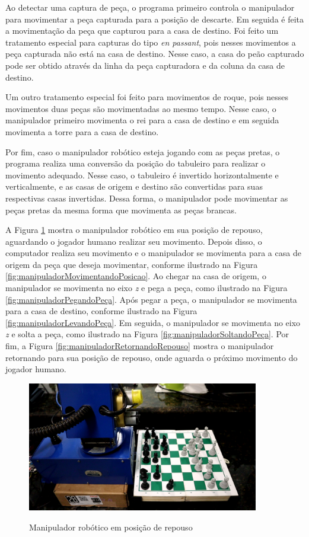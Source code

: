 Ao detectar uma captura de peça, o programa primeiro controla o manipulador para movimentar a peça capturada para a posição de descarte.
Em seguida é feita a movimentação da peça que capturou para a casa de destino.
Foi feito um tratamento especial para capturas do tipo \textit{en passant}, pois nesses movimentos a peça capturada não está na casa de destino.
Nesse caso, a casa do peão capturado pode ser obtido através da linha da peça capturadora e da coluna da casa de destino.

Um outro tratamento especial foi feito para movimentos de roque, pois nesses movimentos duas peças são movimentadas ao mesmo tempo.
Nesse caso, o manipulador primeiro movimenta o rei para a casa de destino e em seguida movimenta a torre para a casa de destino.

Por fim, caso o manipulador robótico esteja jogando com as peças pretas,
o programa realiza uma conversão da posição do tabuleiro para realizar o movimento adequado.
Nesse caso, o tabuleiro é invertido horizontalmente e verticalmente,
e as casas de origem e destino são convertidas para suas respectivas casas invertidas.
Dessa forma, o manipulador pode movimentar as peças pretas da mesma forma que movimenta as peças brancas.

A Figura \ref{fig:manipuladorRepouso} mostra o manipulador robótico em sua posição de repouso, aguardando o jogador humano realizar seu movimento.
Depois disso, o computador realiza seu movimento e o manipulador se movimenta para a casa de origem da peça que deseja movimentar, conforme ilustrado na Figura \ref{fig:manipuladorMovimentandoPosicao}.
Ao chegar na casa de origem, o manipulador se movimenta no eixo \textit{z} e pega a peça, como ilustrado na Figura \ref{fig:manipuladorPegandoPeça}.
Após pegar a peça, o manipulador se movimenta para a casa de destino, conforme ilustrado na Figura \ref{fig:manipuladorLevandoPeça}.
Em seguida, o manipulador se movimenta no eixo \textit{z} e solta a peça, como ilustrado na Figura \ref{fig:manipuladorSoltandoPeça}.
Por fim, a Figura \ref{fig:manipuladorRetornandoRepouso} mostra o manipulador retornando para sua posição de repouso, onde aguarda o próximo movimento do jogador humano.

\begin{figure}[H]
    \centering
    \caption{Manipulador robótico em posição de repouso}
    \includegraphics[keepaspectratio=true, width=0.9\textwidth]
    	{img/posicao-repouso.png}
    \label{fig:manipuladorRepouso}
\end{figure}

